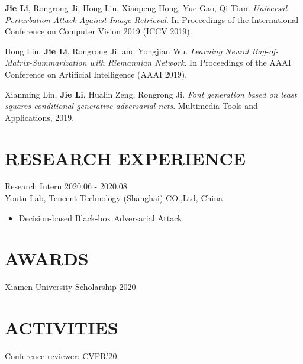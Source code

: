 \documentclass[margin, 10pt]{res} %
\begin{document}
\begin{resume}
\textbf{Jie Li}, Rongrong Ji, Hong Liu, Xiaopeng Hong, Yue Gao, Qi Tian. \textit{Universal Perturbation Attack Against Image Retrieval}.
In Proceedings of the International Conference on Computer Vision 2019 (ICCV 2019).

Hong Liu, \textbf{Jie Li}, Rongrong Ji, and Yongjian Wu. \textit{Learning Neural Bag-of-Matrix-Summarization with Riemannian Network}.
In Proceedings of the AAAI Conference on Artificial Intelligence (AAAI 2019).

Xianming Lin, \textbf{Jie Li}, Hualin Zeng, Rongrong Ji. \textit{Font generation based on least squares conditional generative adversarial nets}.
Multimedia Tools and Applications, 2019.

\section{RESEARCH EXPERIENCE}
Research Intern \hfill 2020.06 - 2020.08 \\
Youtu Lab, Tencent Technology (Shanghai) CO.,Ltd, China
\begin{itemize}
    \item Decision-based Black-box Adversarial Attack
\end{itemize}

\section{AWARDS}
Xiamen University Scholarship \hfill 2020

\section{ACTIVITIES}
Conference reviewer: CVPR'20.

\end{resume}
\end{document}
